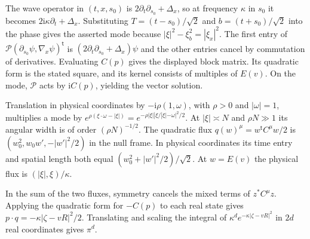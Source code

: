 The wave operator in $(t,x,s_0)$ is $2\partial_t\partial_{s_0}+\Delta_x$, so at frequency $\kappa$ in $s_0$ it becomes $2\mathrm i\kappa\partial_t+\Delta_x$. Substituting $T=(t-s_0)/\sqrt2$ and $b=(t+s_0)/\sqrt2$ into the phase gives the asserted mode because $|\xi|^2-\xi_b^2=|\xi_x|^2$. The first entry of $\mathcal P(\partial_{s_0}\psi,\nabla_x\psi)^{\mathsf t}$ is $(2\partial_t\partial_{s_0}+\Delta_x)\psi$ and the other entries cancel by commutation of derivatives. Evaluating $C(p)$ gives the displayed block matrix. Its quadratic form is the stated square, and its kernel consists of multiples of $E(v)$. On the mode, $\mathcal P$ acts by $\mathrm i C(p)$, yielding the vector solution.

Translation in physical coordinates by $-\mathrm i\rho(1,\omega)$, with $\rho>0$ and $|\omega|=1$, multiplies a mode by $e^{\rho(\xi\cdot\omega-|\xi|)}=e^{-\rho|\xi||\xi/|\xi|-\omega|^2/2}$. At $|\xi|\asymp N$ and $\rho N\gg1$ its angular width is of order $(\rho N)^{-1/2}$. The quadratic flux $q(w)^\mu=w^{\mathsf t}C^\mu w/2$ is $(w_0^2,w_0w',-|w'|^2/2)$ in the null frame. In physical coordinates its time entry and spatial length both equal $(w_0^2+|w'|^2/2)/\sqrt2$. At $w=E(v)$ the physical flux is $(|\xi|,\xi)/\kappa$.

In the sum of the two fluxes, symmetry cancels the mixed terms of $z^*C^\mu z$. Applying the quadratic form for $-C(p)$ to each real state gives $p\cdot q=-\kappa|\zeta-vR|^2/2$. Translating and scaling the integral of $\kappa^d e^{-\kappa|\zeta-vR|^2}$ in $2d$ real coordinates gives $\pi^d$.
